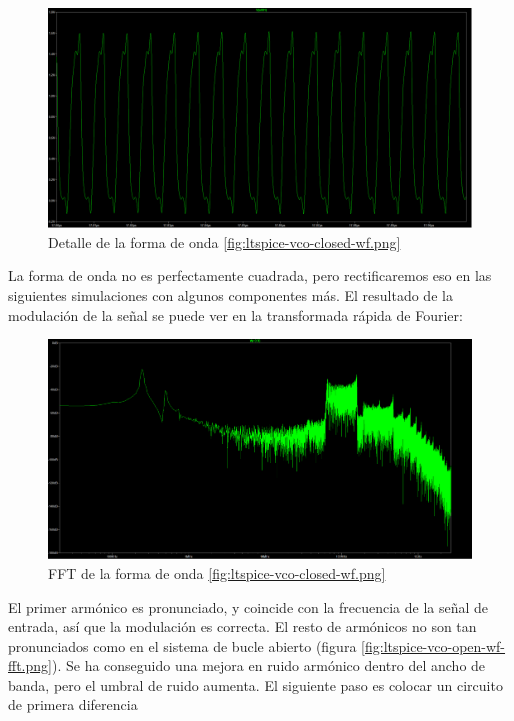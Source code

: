 \documentclass[12pt]{report} %
\begin{document}
	\begin{figure}[H]
		\includegraphics[width=\textwidth]{ltspice-vco-closed-wf-zoom.png}
		\caption[Detalle de la forma de onda \ref{fig:ltspice-vco-closed-wf.png}]{Detalle de la forma de onda \ref{fig:ltspice-vco-closed-wf.png}}
		\label{fig:ltspice-vco-closed-wf-zoom.png}
	\end{figure}
	
	La forma de onda no es perfectamente cuadrada, pero rectificaremos eso en las siguientes simulaciones con algunos componentes más. El resultado de la modulación de la señal se puede ver en la transformada rápida de Fourier:
	
	\begin{figure}[H]
		\includegraphics[width=\textwidth]{ltspice-vco-closed-wf-fft.png}
		\caption[FFT de la forma de onda \ref{fig:ltspice-vco-closed-wf.png}]{FFT de la forma de onda \ref{fig:ltspice-vco-closed-wf.png}}
		\label{fig:ltspice-vco-closed-wf-fft.png}
	\end{figure}
	
	El primer armónico es pronunciado, y coincide con la frecuencia de la señal de entrada, así que la modulación es correcta. El resto de armónicos no son tan pronunciados como en el sistema de bucle abierto (figura \ref{fig:ltspice-vco-open-wf-fft.png}). Se ha conseguido una mejora en ruido armónico dentro del ancho de banda, pero el umbral de ruido aumenta. El siguiente paso es colocar un circuito de primera diferencia %
	
\end{document}
